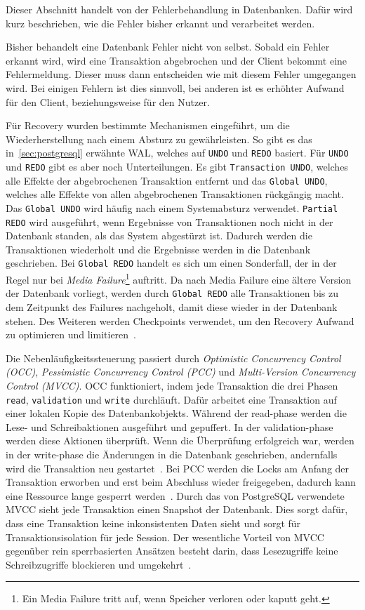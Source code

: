
Dieser Abschnitt handelt von der Fehlerbehandlung in Datenbanken.
Dafür wird kurz beschrieben, wie die Fehler bisher erkannt und verarbeitet werden.

Bisher behandelt eine Datenbank Fehler nicht von selbst.
Sobald ein Fehler erkannt wird, wird eine Transaktion abgebrochen und der Client bekommt eine Fehlermeldung.
Dieser muss dann entscheiden wie mit diesem Fehler umgegangen wird.
Bei einigen Fehlern ist dies sinnvoll, bei anderen ist es erhöhter Aufwand für den Client, beziehungsweise für
den Nutzer.

Für Recovery wurden bestimmte Mechanismen eingeführt, um die Wiederherstellung nach einem Absturz zu gewährleisten.
So gibt es das in~\ref{sec:postgresql} erwähnte WAL, welches auf \texttt{UNDO} und \texttt{REDO} basiert.
Für \texttt{UNDO} und \texttt{REDO} gibt es aber noch Unterteilungen.
Es gibt \texttt{Transaction UNDO}, welches alle Effekte der abgebrochenen Transaktion entfernt und
das \texttt{Global UNDO}, welches alle Effekte von allen abgebrochenen Transaktionen rückgängig macht.
Das \texttt{Global UNDO} wird häufig nach einem Systemabsturz verwendet.
\texttt{Partial REDO} wird ausgeführt, wenn Ergebnisse von Transaktionen noch nicht in der Datenbank standen,
als das System abgestürzt ist.
Dadurch werden die Transaktionen wiederholt und die Ergebnisse werden in die Datenbank geschrieben.
Bei \texttt{Global REDO} handelt es sich um einen Sonderfall, der in der Regel nur bei \emph{Media Failure}\footnote{Ein
	Media Failure tritt auf, wenn Speicher verloren oder kaputt geht.} auftritt.
Da nach Media Failure eine ältere Version der Datenbank vorliegt, werden durch \texttt{Global REDO} alle Transaktionen
bis zu dem Zeitpunkt des Failures nachgeholt, damit diese wieder in der Datenbank stehen.
Des Weiteren werden Checkpoints verwendet, um den Recovery Aufwand zu optimieren und limitieren~\cite{Haerder1983}.

Die Nebenläufigkeitssteuerung passiert durch \emph{Optimistic Concurrency Control (OCC)},
\emph{Pessimistic Concurrency Control (PCC)} und \emph{Multi-Version Concurrency Control (MVCC)}\@.
OCC funktioniert, indem jede Transaktion die drei Phasen \texttt{read}, \texttt{validation} und \texttt{write}
durchläuft.
Dafür arbeitet eine Transaktion auf einer lokalen Kopie des Datenbankobjekts.
Während der read-phase werden die Lese- und Schreibaktionen ausgeführt und gepuffert.
In der validation-phase werden diese Aktionen überprüft.
Wenn die Überprüfung erfolgreich war, werden in der write-phase die Änderungen in die Datenbank geschrieben,
andernfalls wird die Transaktion neu gestartet~\cite{Unland1988Concurrency}.
Bei PCC werden die Locks am Anfang der Transaktion erworben und erst beim Abschluss wieder freigegeben, dadurch kann
eine Ressource lange gesperrt werden~\cite{IBMConcurrencyControl}.
Durch das von PostgreSQL verwendete MVCC sieht jede Transaktion einen Snapshot der Datenbank.
Dies sorgt dafür, dass eine Transaktion keine inkonsistenten Daten sieht und sorgt für Transaktionsisolation für
jede Session.
Der wesentliche Vorteil von MVCC gegenüber rein sperrbasierten Ansätzen besteht darin, dass Lesezugriffe keine
Schreibzugriffe blockieren und umgekehrt~\cite{PostgreSQLMVCC}.